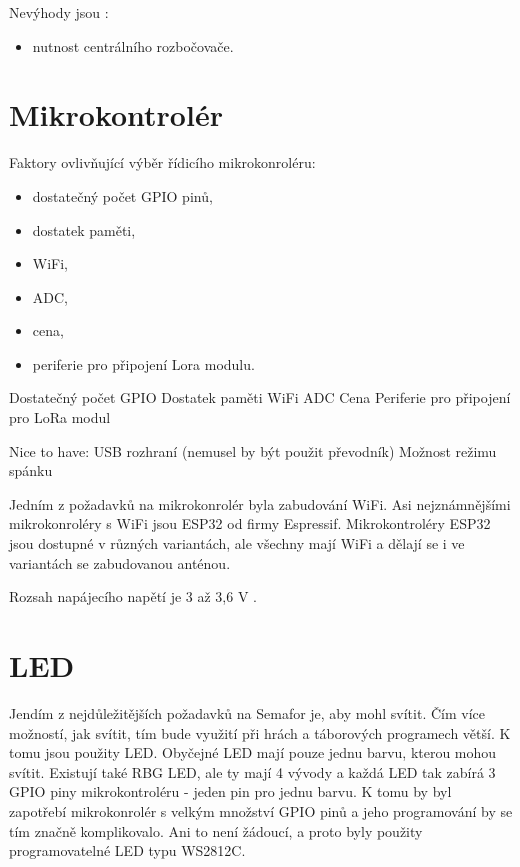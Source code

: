 Nevýhody jsou \cite{ZigBee_smart}:
\begin{itemize}
  \item nutnost centrálního rozbočovače.
\end{itemize}


\section{Mikrokontrolér}
Faktory ovlivňující výběr řídicího mikrokonroléru:
\begin{itemize}
  \item dostatečný počet GPIO pinů,
  \item dostatek paměti,
  \item WiFi,
  \item ADC,
  \item cena,
  \item periferie pro připojení Lora modulu.
\end{itemize}

Dostatečný počet GPIO %
Dostatek paměti %
WiFi
ADC %
Cena %
Periferie pro připojení pro LoRa modul

Nice to have:
USB rozhraní (nemusel by být použit převodník)
Možnost režimu spánku %


Jedním z požadavků na mikrokonrolér byla zabudování WiFi. Asi nejznámnějšími mikrokonroléry s WiFi jsou ESP32 od firmy 
Espressif. Mikrokontroléry ESP32 jsou dostupné v různých variantách, ale všechny mají WiFi a dělají se i ve variantách 
se zabudovanou anténou. 

Rozsah napájecího napětí je 3 až 3,6 V \cite{ESP_C3_dtsh}.

\section{LED}
Jendím z nejdůležitějších požadavků na Semafor je, aby mohl svítit. Čím více možností, jak svítit, tím bude využití 
při hrách a táborových programech větší. K tomu jsou použity LED. Obyčejné LED mají pouze jednu barvu, kterou 
mohou svítit. Existují také RBG LED, ale ty mají 4 vývody a každá LED tak zabírá 3 GPIO piny mikrokontroléru - jeden pin
pro jednu barvu. K tomu by byl zapotřebí mikrokonrolér s velkým množství GPIO pinů a jeho programování by se tím značně 
komplikovalo. Ani to není žádoucí, a proto byly použity programovatelné LED typu WS2812C.


